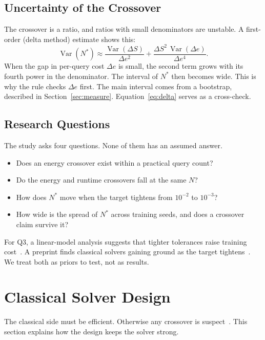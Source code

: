 \documentclass[journal]{IEEEtran}
\newcommand{\Nstar}{N^{\ast}}
\begin{document}
\subsection{Uncertainty of the Crossover}
The crossover is a ratio, and ratios with small denominators are unstable. A first-order (delta method) estimate shows this:
\begin{equation}
\operatorname{Var}(\Nstar)\approx\frac{\operatorname{Var}(\Delta S)}{\Delta e^{2}}+\frac{\Delta S^{2}\,\operatorname{Var}(\Delta e)}{\Delta e^{4}} .
\label{eq:delta}
\end{equation}
When the gap in per-query cost $\Delta e$ is small, the second term grows with its fourth power in the denominator. The interval of $\Nstar$ then becomes wide. This is why the rule checks $\Delta e$ first. The main interval comes from a bootstrap, described in Section~\ref{sec:measure}. Equation~\eqref{eq:delta} serves as a cross-check.

\subsection{Research Questions}
The study asks four questions. None of them has an assumed answer.
\begin{itemize}
\item[Q1.] Does an energy crossover exist within a practical query count?
\item[Q2.] Do the energy and runtime crossovers fall at the same $N$?
\item[Q3.] How does $\Nstar$ move when the target tightens from $10^{-2}$ to $10^{-3}$?
\item[Q4.] How wide is the spread of $\Nstar$ across training seeds, and does a crossover claim survive it?
\end{itemize}
For Q3, a linear-model analysis suggests that tighter tolerances raise training cost~\cite{deryck2024}. A preprint finds classical solvers gaining ground as the target tightens~\cite{huangstuart2026}. We treat both as priors to test, not as results.

\section{Classical Solver Design}\label{sec:classical}

The classical side must be efficient. Otherwise any crossover is suspect~\cite{mcgreivy2024}. This section explains how the design keeps the solver strong.
\end{document}
